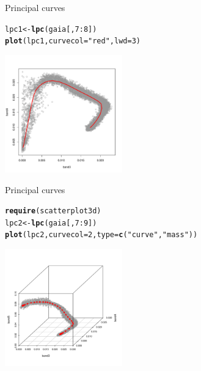 \documentclass[10pt,xcolor=dvipsnames]{beamer}\usepackage[]{graphicx}\usepackage[]{color}
\makeatletter
\newcommand{\hlnum}[1]{\textcolor[rgb]{0.686,0.059,0.569}{#1}}%
\newcommand{\hlstr}[1]{\textcolor[rgb]{0.192,0.494,0.8}{#1}}%
\newcommand{\hlopt}[1]{\textcolor[rgb]{0,0,0}{#1}}%
\newcommand{\hlstd}[1]{\textcolor[rgb]{0.345,0.345,0.345}{#1}}%
\newcommand{\hlkwb}[1]{\textcolor[rgb]{0.69,0.353,0.396}{#1}}%
\newcommand{\hlkwc}[1]{\textcolor[rgb]{0.333,0.667,0.333}{#1}}%
\newcommand{\hlkwd}[1]{\textcolor[rgb]{0.737,0.353,0.396}{\textbf{#1}}}%
\newenvironment{kframe}{%
 \def\at@end@of@kframe{}%
 \ifinner\ifhmode%
  \def\at@end@of@kframe{\end{minipage}}%
  \begin{minipage}{\columnwidth}%
 \fi\fi%
 \def\FrameCommand##1{\hskip\@totalleftmargin \hskip-\fboxsep
 \colorbox{shadecolor}{##1}\hskip-\fboxsep
     \hskip-\linewidth \hskip-\@totalleftmargin \hskip\columnwidth}%
 \MakeFramed {\advance\hsize-\width
   \@totalleftmargin\z@ \linewidth\hsize
   \@setminipage}}%
 {\par\unskip\endMakeFramed%
 \at@end@of@kframe}
\newenvironment{knitrout}{}{} %
\makeatother
\begin{document}
\begin{frame}{Principal curves}

\begin{knitrout}\footnotesize
{}\color{fgcolor}\begin{kframe}
\begin{alltt}
 \hlstd{lpc1} \hlkwb{<-}  \hlkwd{lpc}\hlstd{(gaia[,}\hlnum{7}\hlopt{:}\hlnum{8}\hlstd{])}
 \hlkwd{plot}\hlstd{(lpc1,} \hlkwc{curvecol}\hlstd{=}\hlstr{"red"}\hlstd{,} \hlkwc{lwd}\hlstd{=}\hlnum{3}\hlstd{)}
\end{alltt}
\end{kframe}

{\centering \includegraphics[width=2in]{figure/lcpmPlot-1} 

}



\end{knitrout}

\end{frame}

\begin{frame}{Principal curves}

\begin{knitrout}\footnotesize
{}\color{fgcolor}\begin{kframe}
\begin{alltt}
\hlkwd{require}\hlstd{(scatterplot3d)}
\hlstd{lpc2} \hlkwb{<-} \hlkwd{lpc}\hlstd{(gaia[,}\hlnum{7}\hlopt{:}\hlnum{9}\hlstd{])}
\hlkwd{plot}\hlstd{(lpc2,} \hlkwc{curvecol}\hlstd{=}\hlnum{2}\hlstd{,} \hlkwc{type}\hlstd{=}\hlkwd{c}\hlstd{(}\hlstr{"curve"}\hlstd{,}\hlstr{"mass"}\hlstd{))}
\end{alltt}
\end{kframe}

{\centering \includegraphics[width=2in]{figure/lcpmPlot2-1} 

}



\end{knitrout}

\end{frame}
\end{document}
